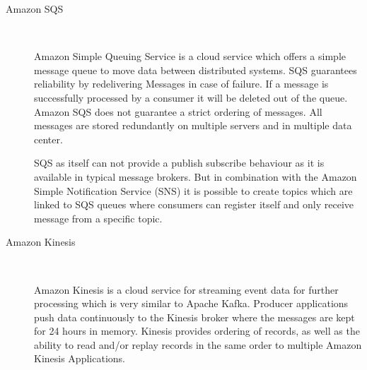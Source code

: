 \begin{description}
    \item [Amazon SQS] \hfill \\
    {
    Amazon Simple Queuing Service is a cloud service which offers a simple
    message queue to move data between distributed systems. SQS guarantees
    reliability by redelivering Messages in case of failure. If a message is
    successfully processed by a consumer it will be deleted out of the queue.
    Amazon SQS does not guarantee a strict ordering of messages. All messages
    are stored redundantly on multiple servers and in multiple data center.
    \cite{amazonSQS} \cite{amazonSQSFaq} 

    SQS as itself can not provide a publish subscribe behaviour as it is
    available in typical message brokers. But in combination with the Amazon
    Simple  Notification Service (SNS) it is possible to create topics which are
    linked to SQS queues where consumers can register itself and only receive
    message from a specific topic. \cite{amazonSqsPubSub}
     }
    \item [Amazon Kinesis] \hfill \\
    { 
    Amazon Kinesis is a cloud service for streaming event
    data for further processing which is very similar to Apache Kafka. Producer
    applications push data continuously to the Kinesis broker where the messages
    are kept for 24 hours in memory. Kinesis provides ordering of records, as
    well as the ability to read and/or replay records in the same order to
    multiple Amazon Kinesis Applications.
    \cite{amazonKinesis} \cite{amazonKinesisFAQ} 
    
}
\end{description}
